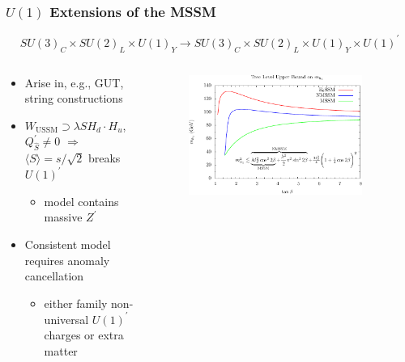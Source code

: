 \documentclass[10pt,aspectratio=169]{beamer}
\begin{document}
\begin{frame}
  \frametitle{$U(1)$ Extensions of the MSSM}
    \begin{equation*}
      SU(3)_C \times SU(2)_L \times U(1)_Y \to
      SU(3)_C \times SU(2)_L \times U(1)_Y \times U(1)^\prime
    \end{equation*}
    \vspace{-15pt}
  \begin{columns}[t]
    \begin{column}{0.45\textwidth}
      \begin{itemize} \itemsep1em
        \item Arise in, e.g., GUT, string constructions
        \item $W_{\text{USSM}} \supset \lambda S H_d
          \cdot H_u$, $Q^\prime_{\hat{S}} \neq 0$ $\Rightarrow$
          $\langle S \rangle = s / \sqrt{2}$ breaks $U(1)^\prime$
          \begin{itemize}
            \item {\color{blue} model contains massive $Z^\prime$ }
          \end{itemize}
        \item Consistent model requires anomaly cancellation
          \begin{itemize}
            \item either family non-universal $U(1)^\prime$ charges
              or {\color{blue} extra matter}
          \end{itemize}
      \end{itemize}
    \end{column}
    \begin{column}{0.6\textwidth}
      \vspace{-10pt}
      \begin{figure}
        \centering
        \includegraphics[width=0.9\textwidth]{treelevel_higgs_upperbound_plot}

\end{figure}
\end{column}
\end{columns}
\end{frame}
\end{document}
